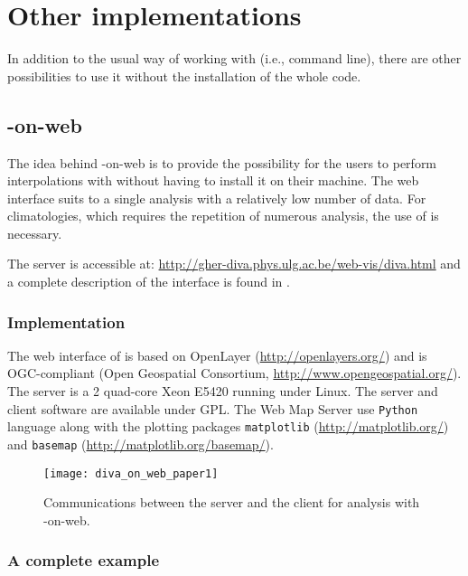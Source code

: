 \chapter{Other implementations\label{chap:divaonweb}}

In addition to the usual way of working with \diva (i.e., command line), there are other possibilities to use it without the installation of the whole code.
 
\minitoc

\newpage %

\section{\diva-on-web}

The idea behind \diva-on-web is to provide the possibility for the users to perform interpolations with \diva without having to install it on their machine. The web interface suits to a single analysis with a relatively low number of data. For climatologies, which requires the repetition of numerous analysis, the use of \diva is necessary.

The server is accessible at: \url{http://gher-diva.phys.ulg.ac.be/web-vis/diva.html} and a complete description of the interface is found in \citet{BARTH10}.


\subsection{Implementation}

The web interface of \diva is based on OpenLayer (\url{http://openlayers.org/}) and is OGC-compliant (Open Geospatial Consortium, \url{http://www.opengeospatial.org/}). The server is a 2 quad-core Xeon E5420 running under Linux. The server and client software are available under GPL. The Web Map Server use \texttt{Python} language along with the plotting packages \texttt{matplotlib} (\url{http://matplotlib.org/}) and \texttt{basemap} (\url{http://matplotlib.org/basemap/}). 

\begin{figure}[htpb]
	\centering
	\parbox{.55\textwidth}{
		\texttt{[image: diva\_on\_web\_paper1]}
		}\parbox{.45\textwidth}{
		\caption{Communications between the server and the client for analysis with \diva-on-web.\label{fig:diva_on_web_paper1}}
		}
\end{figure}

\subsection{A complete example}

